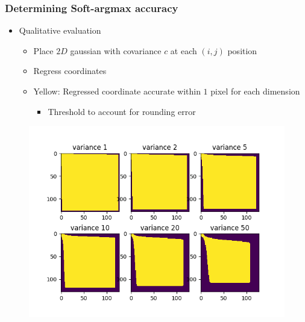 \documentclass[9pt]{beamer}
\newenvironment{myframe}[1][]{%
\begin{frame}%
\frametitle{#1}
\setcounter{footnote}{0}


}{%
\end{frame}%
}
\begin{document}
\begin{myframe}[Determining Soft-argmax accuracy]
    \begin{itemize}
        \item Qualitative evaluation
        \begin{itemize}
            \item Place $2D$ gaussian with covariance $c$ at each $(i,j)$ position
            \item Regress coordinates
            \item Yellow: Regressed coordinate accurate within $1$ pixel for each dimension
            \begin{itemize}
                \item Threshold to account for rounding error
            \end{itemize}
        \end{itemize}
    \end{itemize}
    \begin{figure}
        \includegraphics[height=.60\textheight]{softargmax_variance_test.png}
        \centering
    \end{figure}    
\end{myframe}
\end{document}
